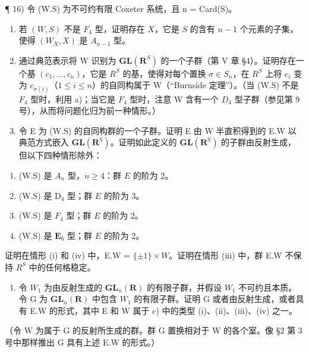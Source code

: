 ¶ 16) 令 (W.S) 为不可约有限 Coxeter 系统，且 n = Card(S)。

\begin{enumerate}
\def\labelenumi{\alph{enumi})}
\item
  若 \((W, S)\) 不是 \(F_4\) 型，证明存在 \(X\)，它是 \(S\) 的含有 \(n - 1\) 个元素的子集，使得 \((W_X, X)\) 是 \(A_{n-1}\) 型。
\item
  通过典范表示将 W 识别为 \(\mathbf{GL}(\mathbf{R}^{S})\) 的一个子群（第 V 章 §4）。证明存在一个基 \((c_{1},\ldots,c_{n})\)，它是 \(R^{S}\) 的基，使得对每个置换 \(\sigma\in S_{n}\)，在 \(R^{S}\) 上将 \(e_{i}\) 变为 \(c_{\sigma(i)}\)（\(1\leqslant i\leqslant n\)）的自同构属于 W（``Burnside 定理''）。（当 (W.S) 不是 \(F_{4}\) 型时，利用 a)；当它是 \(F_{4}\) 型时，注意 W 含有一个 \(D_{4}\) 型子群（参见第 9 号），从而将问题化归为前一种情形。）
\item
  令 E 为 (W.S) 的自同构群的一个子群。证明 E 由 W 半直积得到的 E.W 以典范方式嵌入 \(\mathbf{GL}(\mathbf{R}^{\mathrm{S}})\)。证明如此定义的 \(\mathbf{GL}(\mathbf{R}^{\mathrm{S}})\) 的子群由反射生成，但以下四种情形除外：
\end{enumerate}

\begin{enumerate}
\def\labelenumi{(\roman{enumi})}
\item
  (W.S) 是 \(A_{n}\) 型，\(n \geqslant 4\)：群 \(E\) 的阶为 2。
\item
  (W.S) 是 \(\mathrm{D}_4\) 型；群 \(E\) 的阶为 3。
\item
  (W.S) 是 \(F_4\) 型；群 \(E\) 的阶为 2。
\item
  (W.S) 是 \(\mathbf{E}_6\) 型；群 \(E\) 的阶为 2。
\end{enumerate}

证明在情形 (i) 和 (iv) 中，E.W = \(\{\pm1\} \times W\)。证明在情形 (iii) 中，群 E.W 不保持 \(R^{S}\) 中的任何格稳定。

\begin{enumerate}
\def\labelenumi{\alph{enumi})}
\setcounter{enumi}{3}
\tightlist
\item
  令 \(W_{1}\) 为由反射生成的 \(\mathbf{GL}_{n}(\mathbf{R})\) 的有限子群，并假设 \(W_{1}\) 不可约且本质。令 G 为 \(\mathbf{GL}_{n}(\mathbf{R})\) 中包含 \(W_{1}\) 的有限子群。证明 G 或者由反射生成，或者具有 E.W 的形式，其中 E 和 W 属于 c) 中的类型 (i)、(ii)、(iii)、(iv) 之一。
\end{enumerate}

（令 W 为属于 G 的反射所生成的群。群 G 置换相对于 W 的各个室。像 §2 第 3 号中那样推出 G 具有上述 E.W 的形式。）
